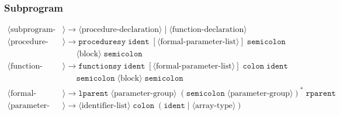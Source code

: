 \documentclass[12pt,a4paper]{article}
\begin{document}
\subsubsection{Subprogram}
\begin{align*}
\langle \text{subprogram-declaration} \rangle &\rightarrow \langle \text{procedure-declaration} \rangle \;|\; \langle \text{function-declaration} \rangle \\
\langle \text{procedure-declaration} \rangle &\rightarrow \texttt{proceduresy} \; \texttt{ident} \; [ \langle \text{formal-parameter-list} \rangle ] \; \texttt{semicolon} \\
&\quad\; \langle \text{block} \rangle \; \texttt{semicolon} \\
\langle \text{function-declaration} \rangle &\rightarrow \texttt{functionsy} \; \texttt{ident} \; [ \langle \text{formal-parameter-list} \rangle ] \; \texttt{colon} \; \texttt{ident} \\
&\quad\; \texttt{semicolon} \; \langle \text{block} \rangle \; \texttt{semicolon} \\
\langle \text{formal-parameter-list} \rangle &\rightarrow \texttt{lparent} \; \langle \text{parameter-group} \rangle \; ( \texttt{semicolon} \; \langle \text{parameter-group} \rangle )^* \; \texttt{rparent} \\
\langle \text{parameter-group} \rangle &\rightarrow \langle \text{identifier-list} \rangle \; \texttt{colon} \; ( \texttt{ident} \;|\; \langle \text{array-type} \rangle )
\end{align*}
\end{document}
